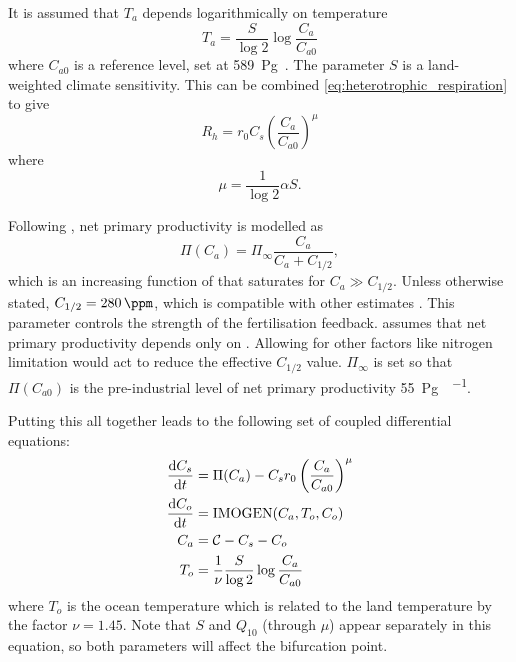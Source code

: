 It is assumed that $T_a$ depends logarithmically on temperature
\begin{equation}
  \label{eq:air_temperature}
  T_a = \frac{S}{\log 2} \log \frac{C_a}{C_{a0}}
\end{equation}
where $C_{a0}$ is a reference  level, set at \SI{589}{\peta\gram\carbon}. The parameter $S$ is a land-weighted climate sensitivity. This can be combined \cref{eq:heterotrophic_respiration}
to give
\begin{equation}
  \label{eq:heterotrophic_respiration_combined}
  R_h = r_0 C_s \left( \frac{C_a}{C_{a0}}\right)^{\mu}
\end{equation}
where
\begin{equation}
  \label{eq:mu}
  \mu = \frac{1}{\log 2} \alpha S.
\end{equation}


Following \cite{Cox2006}, net primary productivity is modelled as
\begin{equation}
  \label{eq:npp}
  \Pi(C_a) = \Pi_{\infty}\frac{C_a}{C_a + C_{1/2}},
\end{equation}
which is an increasing function of  that saturates for $C_a \gg C_{1/2}$. Unless otherwise stated, $C_{1/2} = \SI{280}{\ppm}$, which is compatible with other estimates
\parencite{KolbySmith2016,Wenzel2016}. This parameter controls the strength of the  fertilisation feedback.  assumes that net primary productivity depends only
on . Allowing for other factors like nitrogen limitation would act to reduce the effective $C_{1/2}$ value. $\Pi_{\infty}$ is set so that $\Pi(C_{a0})$ is the pre-industrial
level of net primary productivity \SI{55}{\peta\gram\carbon\per\year}.

Putting this all together leads to the following set of coupled differential equations:
\begin{subequations}
  \label{eq:imogen_deterministic}
  \begin{align}
    \dv{C_s}{t}     &= \Pi(C_a) - C_s r_0 \left(\frac{C_a}{C_{a0}}\right)^\mu \\
    \dv{C_o}{t}     &= \mathrm{IMOGEN}(C_a,T_o,C_o) \\
    C_a             &= \mathcal{C} - C_s - C_o \\
    T_o             &= \frac{1}{\nu}\frac{S}{\log 2}\log \frac{C_a}{C_{a0}}
  \end{align}
\end{subequations}
where $T_o$ is the ocean temperature which is related to the land temperature by the factor $\nu = 1.45$. Note that $S$ and $Q_{10}$ (through $\mu$) appear separately in this equation,
so both parameters will affect the bifurcation point.

